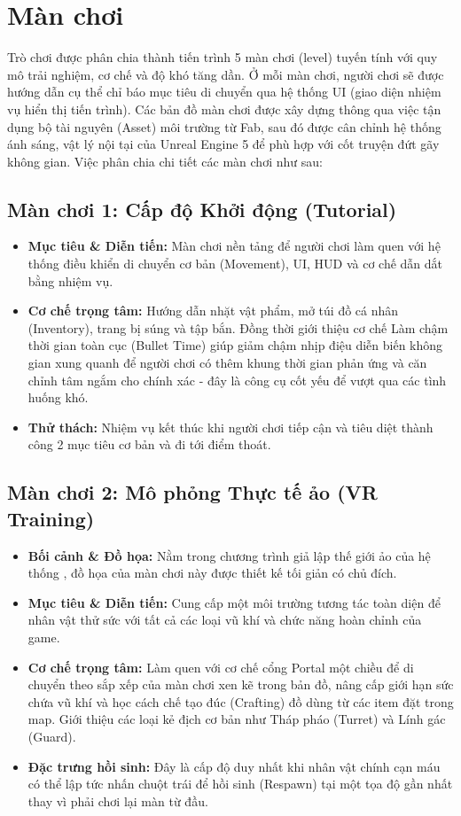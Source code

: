 \documentclass[../DoAn.tex]{subfiles}
\begin{document}
\section{Màn chơi}
Trò chơi được phân chia thành tiến trình 5 màn chơi (level) tuyến tính với quy mô trải nghiệm, cơ chế và độ khó tăng dần. Ở mỗi màn chơi, người chơi sẽ được hướng dẫn cụ thể chỉ báo mục tiêu di chuyển qua hệ thống UI (giao diện nhiệm vụ hiển thị tiến trình). Các bản đồ màn chơi được xây dựng thông qua việc tận dụng bộ tài nguyên (Asset) môi trường từ Fab, sau đó được cân chỉnh hệ thống ánh sáng, vật lý nội tại của Unreal Engine 5 để phù hợp với cốt truyện đứt gãy không gian. Việc phân chia chi tiết các màn chơi như sau:

\subsection{Màn chơi 1: Cấp độ Khởi động (Tutorial)}
\begin{itemize}
    \item \textbf{Mục tiêu \& Diễn tiến:} Màn chơi nền tảng để người chơi làm quen với hệ thống điều khiển di chuyển cơ bản (Movement), UI, HUD và cơ chế dẫn dắt bằng nhiệm vụ.
    \item \textbf{Cơ chế trọng tâm:} Hướng dẫn nhặt vật phẩm, mở túi đồ cá nhân (Inventory), trang bị súng và tập bắn. Đồng thời giới thiệu cơ chế Làm chậm thời gian toàn cục (Bullet Time) giúp giảm chậm nhịp điệu diễn biến không gian xung quanh để người chơi có thêm khung thời gian phản ứng và căn chỉnh tâm ngắm cho chính xác - đây là công cụ cốt yếu để vượt qua các tình huống khó.
    \item \textbf{Thử thách:} Nhiệm vụ kết thúc khi người chơi tiếp cận và tiêu diệt thành công 2 mục tiêu cơ bản và đi tới điểm thoát.
\end{itemize}

\subsection{Màn chơi 2: Mô phỏng Thực tế ảo (VR Training)}
\begin{itemize}
    \item \textbf{Bối cảnh \& Đồ họa:} Nằm trong chương trình giả lập thế giới ảo của hệ thống , đồ họa của màn chơi này được thiết kế tối giản có chủ đích.
    \item \textbf{Mục tiêu \& Diễn tiến:} Cung cấp một môi trường tương tác toàn diện để nhân vật thử sức với tất cả các loại vũ khí và chức năng hoàn chỉnh của game.
    \item \textbf{Cơ chế trọng tâm:} Làm quen với cơ chế cổng Portal một chiều để di chuyển theo sắp xếp của màn chơi xen kẽ trong bản đồ, nâng cấp giới hạn sức chứa vũ khí và học cách chế tạo đúc (Crafting) đồ dùng từ các item đặt trong map. Giới thiệu các loại kẻ địch cơ bản như Tháp pháo (Turret) và Lính gác (Guard).
    \item \textbf{Đặc trưng hồi sinh:} Đây là cấp độ duy nhất khi nhân vật chính cạn máu có thể lập tức nhấn chuột trái để hồi sinh (Respawn) tại một tọa độ gần nhất thay vì phải chơi lại màn từ đầu.
\end{itemize}
\end{document}
